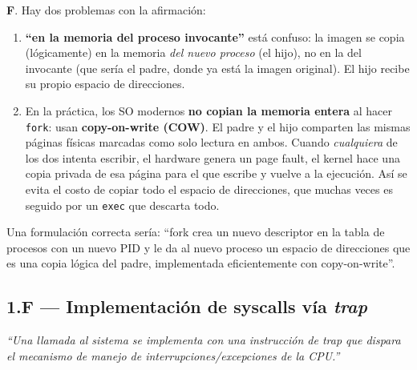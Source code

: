 \documentclass[11pt,a4paper]{article}
\begin{document}
\begin{respuesta}
\textbf{F}. Hay dos problemas con la afirmación:

\begin{enumerate}[leftmargin=*]
    \item \textbf{``en la memoria del proceso invocante''} está
        confuso: la imagen se copia (lógicamente) en la memoria
        \emph{del nuevo proceso} (el hijo), no en la del invocante
        (que sería el padre, donde ya está la imagen original). El
        hijo recibe su propio espacio de direcciones.

    \item En la práctica, los SO modernos \textbf{no copian la
        memoria entera} al hacer \texttt{fork}: usan
        \textbf{copy-on-write (COW)}. El padre y el hijo comparten
        las mismas páginas físicas marcadas como solo lectura en
        ambos. Cuando \emph{cualquiera} de los dos intenta escribir,
        el hardware genera un page fault, el kernel hace una copia
        privada de esa página para el que escribe y vuelve a la
        ejecución. Así se evita el costo de copiar todo el espacio
        de direcciones, que muchas veces es seguido por un
        \texttt{exec} que descarta todo.
\end{enumerate}

Una formulación correcta sería: ``fork crea un nuevo descriptor en
la tabla de procesos con un nuevo PID y le da al nuevo proceso un
espacio de direcciones que es una copia lógica del padre,
implementada eficientemente con copy-on-write''.
\end{respuesta}

\subsection*{1.F --- Implementación de syscalls vía \emph{trap}}

\emph{``Una llamada al sistema se implementa con una instrucción de
trap que dispara el mecanismo de manejo de interrupciones/excepciones
de la CPU.''}
\end{document}
